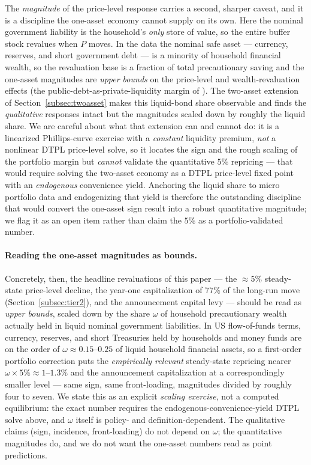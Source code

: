 \documentclass[12pt]{article}
\begin{document}
The \emph{magnitude} of the price-level response carries a second, sharper
caveat, and it is a discipline the one-asset economy cannot supply on its own.
Here the nominal government liability is the household's \emph{only} store of
value, so the entire buffer stock revalues when $P$ moves. In the data the
nominal safe asset --- currency, reserves, and short government debt --- is a
minority of household financial wealth, so the revaluation base is a fraction
of total precautionary saving and the one-asset magnitudes are \emph{upper
bounds} on the price-level and wealth-revaluation effects (the
public-debt-as-private-liquidity margin of \citealp{woodford1990}). The
two-asset extension of Section~\ref{subsec:twoasset} makes this liquid-bond
share observable and finds the \emph{qualitative} responses intact but the
magnitudes scaled down by roughly the liquid share. We are careful about what
that extension can and cannot do: it is a linearized Phillips-curve exercise
with a \emph{constant} liquidity premium, \emph{not} a nonlinear DTPL
price-level solve, so it locates the sign and the rough scaling of the
portfolio margin but \emph{cannot} validate the quantitative $5\%$ repricing
--- that would require solving the two-asset economy as a DTPL price-level
fixed point with an \emph{endogenous} convenience yield. Anchoring the liquid
share to micro portfolio data and endogenizing that yield is therefore the
outstanding discipline that would convert the one-asset sign result into a
robust quantitative magnitude; we flag it as an open item rather than claim the
$5\%$ as a portfolio-validated number.

\paragraph{Reading the one-asset magnitudes as bounds.} Concretely, then, the
headline revaluations of this paper --- the $\approx5\%$ steady-state
price-level decline, the year-one capitalization of $77\%$ of the long-run move
(Section~\ref{subsec:tier2}), and the announcement capital levy --- should be
read as \emph{upper bounds}, scaled down by the share $\omega$ of household
precautionary wealth actually held in liquid nominal government liabilities. In
US flow-of-funds terms, currency, reserves, and short Treasuries held by
households and money funds are on the order of $\omega\approx0.15$--$0.25$ of
liquid household financial assets, so a first-order portfolio correction puts
the \emph{empirically relevant} steady-state repricing nearer
$\omega\times5\%\approx1$--$1.3\%$ and the announcement capitalization at a
correspondingly smaller level --- same sign, same front-loading, magnitudes
divided by roughly four to seven. We state this as an explicit
\emph{scaling exercise}, not a computed equilibrium: the exact number requires
the endogenous-convenience-yield DTPL solve above, and $\omega$ itself is
policy- and definition-dependent. The qualitative claims (sign, incidence,
front-loading) do not depend on $\omega$; the quantitative magnitudes do, and
we do not want the one-asset numbers read as point predictions.
\end{document}
